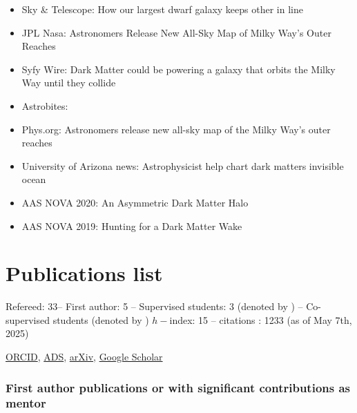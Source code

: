 \documentclass[14pt]{article}
\begin{document}
\begin{itemize}
  \setlength\itemsep{0.0em}
  \renewcommand\labelitemi{$\cdot$}
  \item Sky \& Telescope: How our largest dwarf galaxy keeps other in line
  \item JPL Nasa: Astronomers Release New All-Sky Map of Milky Way’s Outer Reaches
  \item Syfy Wire: Dark Matter could be powering a galaxy that orbits the Milky Way until they collide
  \item Astrobites: 
  \item Phys.org: Astronomers release new all-sky map of the Milky Way's outer reaches
 \item University of Arizona news: Astrophysicist help chart dark matters invisible ocean
 \item AAS NOVA 2020: An Asymmetric Dark Matter Halo
 \item AAS NOVA 2019: Hunting for a Dark Matter Wake

\end{itemize}




\section*{Publications list}

Refereed: 33-- First author: 5 -- Supervised students: 3 (denoted by \dag ) --
Co-supervised students (denoted by \ddag) $h-$index: 15 -- citations : 1233 (as of May 7th, 2025) 

\noindent \href{https://orcid.org/0000-0001-7107-1744}{ORCID},
\href{https://ui.adsabs.harvard.edu/search/q=docs(library%2F0X5_bcuLT4iE-6-Nko0kmg)&sort=date%20desc%2C%20bibcode%20desc&p_=0}{ADS},
\href{https://arxiv.org/search/?query=garavito-camargo&searchtype=all}{arXiv},
\href{https://scholar.google.com/citations?user=QDLiOFYAAAAJ&hl=en&oi=ao}{Google
Scholar}\\

\subsubsection*{First author publications or with significant contributions as mentor}
\end{document}

